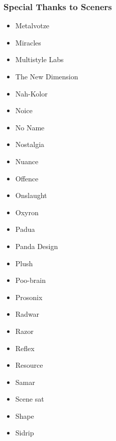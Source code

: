 \begin{frame}
\frametitle{Special Thanks to Sceners}

\begin{multicols}{3}
\begin{itemize}
\item Metalvotze
\item Miracles
\item Multistyle Labs
\item The New Dimension
\item Nah-Kolor
\item Noice
\item No Name
\item Nostalgia
\item Nuance
\item Offence
\item Onslaught
\item Oxyron
\item Padua
\item Panda Design
\item Plush
\item Poo-brain
\item Prosonix
\item Radwar
\item Razor
\item Reflex
\item Resource
\item Samar
\item Scene sat
\item Shape
\item Sidrip
\end{itemize}
\end{multicols}

\end{frame}


